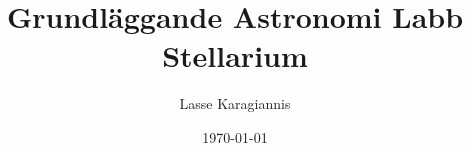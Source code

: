 \documentclass{article}
\title{Grundläggande Astronomi Labb Stellarium\\}
\author{Lasse Karagiannis}
\date{\today} %
\begin{document}
\begin{titlepage}
\maketitle
\end{titlepage}
\tableofcontents
\newpage

%
%
%
%
%


\end{document}
